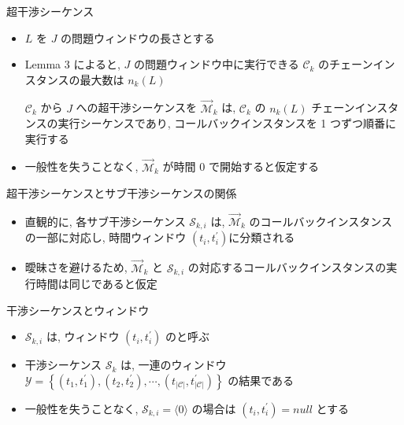 \begin{frame}{超干渉シーケンス}
    \begin{itemize}
        \item $L$ を $J$ の問題ウィンドウの長さとする
        \item Lemma 3 によると,  $J$ の問題ウィンドウ中に実行できる $\mathcal{C}_{k}$ のチェーンインスタンスの最大数は $n_{k}(L)$
              \begin{definition}
                  $\mathcal{C}_{k}$ から $J$ への超干渉シーケンスを $\overrightarrow{\mathcal{M}}_{k}$ は, $\mathcal{C}_{k}$ の $n_{k}(L)$ チェーンインスタンスの実行シーケンスであり, コールバックインスタンスを 1 つずつ順番に実行する
              \end{definition}
              \vspace{5mm}
        \item 一般性を失うことなく,  $\overrightarrow{\mathcal{M}}_{k}$ が時間 0 で開始すると仮定する
    \end{itemize}
\end{frame}

\begin{frame}{超干渉シーケンスとサブ干渉シーケンスの関係}
    \begin{itemize}
        \item 直観的に, 各サブ干渉シーケンス $\mathcal{S}_{k, i}$ は, $\overrightarrow{\mathcal{M}}_{k}$ のコールバックインスタンスの一部に対応し, 時間ウィンドウ $\left(t_{i}, t_{i}^{\prime}\right)$に分類される
        \item 曖昧さを避けるため, $\overrightarrow{\mathcal{M}}_{k}$ と $\mathcal{S}_{k, i}$ の対応するコールバックインスタンスの実行時間は同じであると仮定
    \end{itemize}
\end{frame}

\begin{frame}{干渉シーケンスとウィンドウ}
    \begin{itemize}
        \item $\mathcal{S}_{k, i}$ は, ウィンドウ $\left(t_{i}, t_{i}^{\prime}\right)$ のと呼ぶ
        \item 干渉シーケンス $\mathcal{S}_{k}$ は, 一連のウィンドウ $\mathcal{Y}=\left\{\left(t_{1}, t_{1}^{\prime}\right),\left(t_{2}, t_{2}^{\prime}\right), \cdots,\left(t_{|\mathcal{C}|}, t_{|\mathcal{C}|}^{\prime}\right)\right\}$ の結果である
        \item 一般性を失うことなく, $\mathcal{S}_{k, i}=\langle 0\rangle$ の場合は $\left(t_{i}, t_{i}^{\prime}\right)=n u l l$ とする
    \end{itemize}
\end{frame}

